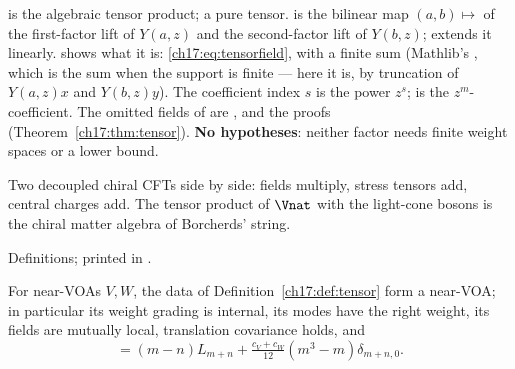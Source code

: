\begin{dictionary}
 is the algebraic tensor product;  a pure tensor.   is the
bilinear map $(a,b)\mapsto$  of the first-factor lift of $Y(a,z)$ and the second-factor lift of
$Y(b,z)$;  extends it linearly.   shows what it is:
\eqref{ch17:eq:tensorfield}, with  a finite sum (Mathlib's , which is the sum when the
support is finite --- here it is, by truncation of $Y(a,z)x$ and $Y(b,z)y$).  The coefficient index $s$ is the
power $z^s$;  is the $z^m$-coefficient.  The omitted fields of  are
, 
and the proofs (Theorem~\ref{ch17:thm:tensor}).  \textbf{No hypotheses}: neither factor needs finite weight spaces or
a lower bound.
\end{dictionary}

\begin{physics}
Two decoupled chiral CFTs side by side: fields multiply, stress tensors add, central charges add.  The tensor
product of $\Vnat$ with the light-cone bosons is the chiral matter algebra of Borcherds' string.
\end{physics}

\begin{status}
Definitions; printed in .
\end{status}

\begin{theorem}\label{ch17:thm:tensor}
For near-VOAs $V,W$, the data of Definition~\ref{ch17:def:tensor} form a near-VOA; in particular its weight grading is
internal, its modes have the right weight, its fields are mutually local, translation covariance holds, and
\begin{equation*}
  [L_m,L_n]=(m-n)L_{m+n}+\tfrac{c_V+c_W}{12}(m^3-m)\delta_{m+n,0}.
\end{equation*}
\end{theorem}

